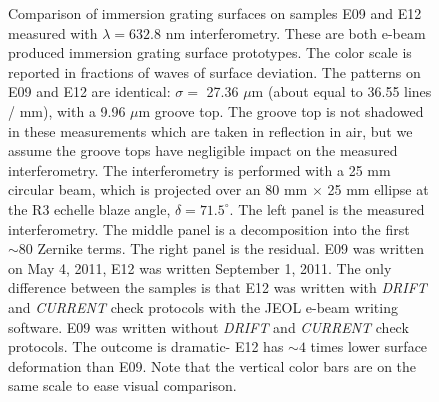 \documentclass[]{spie}  %
\begin{document}
\begin{figure}
   \newline
  \caption{Comparison of immersion grating surfaces on samples E09 and E12 measured with $\lambda = 632.8 $ nm interferometry.  These are both e-beam produced immersion grating surface prototypes.  The color scale is reported in fractions of waves of surface deviation.  The patterns on E09 and E12 are identical: $\sigma = $ 27.36 $\mu$m (about equal to 36.55 lines / mm), with a 9.96 $\mu$m groove top.  The groove top is not shadowed in these measurements which are taken in reflection in air, but we assume the groove tops have negligible impact on the measured interferometry.  The interferometry is performed with a 25 mm circular beam, which is projected over an 80 mm $\times$ 25 mm ellipse at the R3 echelle blaze angle, $\delta = 71.5 ^\circ$.  The left panel is the measured interferometry.  The middle panel is a decomposition into the first $\sim 80$ Zernike terms.  The right panel is the residual.  E09 was written on May 4, 2011, E12 was written September 1, 2011.  The only difference between the samples is that E12 was written with \emph{DRIFT} and \emph{CURRENT} check protocols with the JEOL e-beam writing software.  E09 was written without \emph{DRIFT} and \emph{CURRENT} check protocols.  The outcome is dramatic- E12 has $\sim 4$ times lower surface deformation than E09.  Note that the vertical color bars are on the same scale to ease visual comparison.}
  \label{fig:igrams}
\end{figure}
\end{document}
